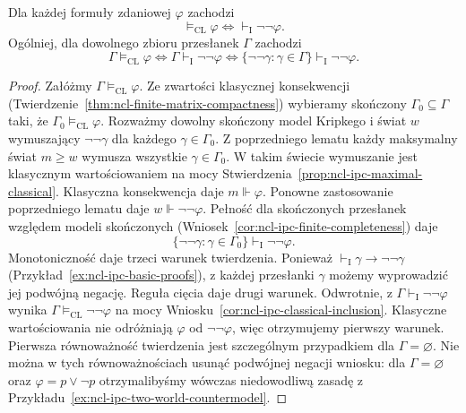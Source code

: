 \begin{twierdzenie}
\label{thm:ncl-ipc-glivenko}
Dla każdej formuły zdaniowej $\varphi$ zachodzi
\[
 \models_{\mathrm{CL}}\varphi
 \iff \vdash_{\mathrm I}\neg\neg\varphi.
\]
Ogólniej, dla dowolnego zbioru przesłanek $\Gamma$
zachodzi
\[
 \Gamma\models_{\mathrm{CL}}\varphi
 \iff \Gamma\vdash_{\mathrm I}\neg\neg\varphi
 \iff \{\neg\neg\gamma:\gamma\in\Gamma\}
                  \vdash_{\mathrm I}\neg\neg\varphi.
\]
\end{twierdzenie}
\begin{proof}
Załóżmy $\Gamma\models_{\mathrm{CL}}\varphi$.
Ze zwartości klasycznej konsekwencji
(Twierdzenie~\ref{thm:ncl-finite-matrix-compactness})
wybieramy skończony $\Gamma_0\subseteq\Gamma$
taki, że $\Gamma_0\models_{\mathrm{CL}}\varphi$.
Rozważmy dowolny skończony model Kripkego i świat $w$
wymuszający $\neg\neg\gamma$ dla każdego
$\gamma\in\Gamma_0$. Z poprzedniego lematu każdy
maksymalny świat $m\geq w$ wymusza wszystkie
$\gamma\in\Gamma_0$. W takim świecie wymuszanie
jest klasycznym wartościowaniem na mocy
Stwierdzenia~\ref{prop:ncl-ipc-maximal-classical}.
Klasyczna konsekwencja daje $m\Vdash\varphi$.
Ponowne zastosowanie poprzedniego lematu daje
$w\Vdash\neg\neg\varphi$.
Pełność dla skończonych przesłanek względem modeli
skończonych (Wniosek~\ref{cor:ncl-ipc-finite-completeness})
daje
\[
 \{\neg\neg\gamma:\gamma\in\Gamma_0\}
 \vdash_{\mathrm I}\neg\neg\varphi.
\]
Monotoniczność daje trzeci warunek twierdzenia.
Ponieważ $\vdash_{\mathrm I}\gamma\to\neg\neg\gamma$
(Przykład~\ref{ex:ncl-ipc-basic-proofs}), z każdej
przesłanki $\gamma$ możemy wyprowadzić jej podwójną
negację. Reguła cięcia daje drugi warunek.
Odwrotnie, z $\Gamma\vdash_{\mathrm I}\neg\neg\varphi$
wynika $\Gamma\models_{\mathrm{CL}}\neg\neg\varphi$
na mocy Wniosku~\ref{cor:ncl-ipc-classical-inclusion}.
Klasyczne wartościowania nie odróżniają $\varphi$
od $\neg\neg\varphi$, więc otrzymujemy pierwszy warunek.
Pierwsza równoważność twierdzenia jest szczególnym
przypadkiem dla $\Gamma=\varnothing$.
Nie można w tych równoważnościach usunąć podwójnej
negacji wniosku: dla $\Gamma=\varnothing$ oraz
$\varphi=p\vee\neg p$ otrzymalibyśmy wówczas
niedowodliwą zasadę z
Przykładu~\ref{ex:ncl-ipc-two-world-countermodel}.
\end{proof}

